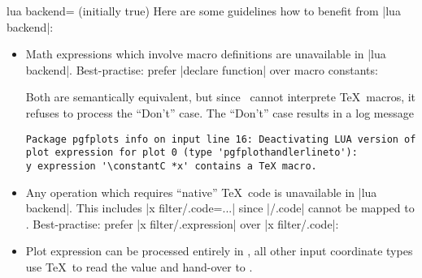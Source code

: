 {\begin{pgfplotskey}{lua backend= (initially true)}
	Here are some guidelines how to benefit from |lua backend|:
	\begin{itemize}
		\item Math expressions which involve macro definitions are unavailable in |lua backend|. Best-practise: prefer |declare function| over macro constants:
\begin{codeexample}[]
\end{codeexample}
\begin{codeexample}[]
\end{codeexample}

		Both are semantically equivalent, but since \lua\ cannot interprete \TeX\ macros, it refuses to process the ``Don't'' case. The ``Don't'' case results in a log message

\begin{verbatim}
Package pgfplots info on input line 16: Deactivating LUA version of
plot expression for plot 0 (type 'pgfplothandlerlineto'):
y expression '\constantC *x' contains a TeX macro.
\end{verbatim}

		\item Any operation which requires ``native'' \TeX\ code is unavailable in |lua backend|. This includes |x filter/.code={...}| since |/.code| cannot be mapped to \lua. Best-practise: prefer |x filter/.expression| over |x filter/.code|:
\begin{codeexample}[]
\end{codeexample}

		\item Plot expression can be processed entirely in \lua, all other input coordinate types use \TeX\ to read the value and hand-over to \lua.


\end{itemize}
\end{pgfplotskey}}
